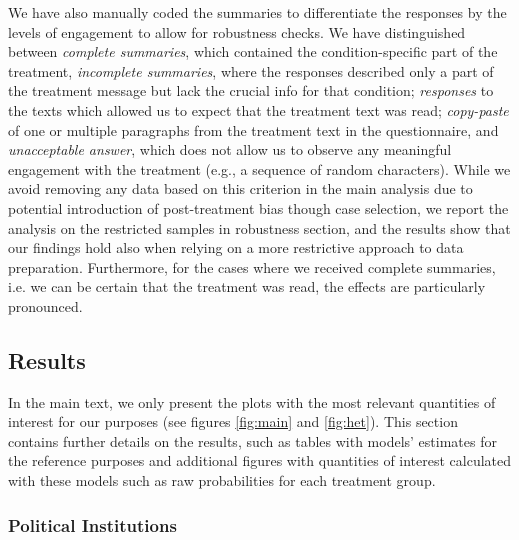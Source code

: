 \documentclass[11pt, ngerman,english,a4]{article}
\begin{document}





\clearpage

We have also manually coded the summaries to differentiate the responses by the levels of engagement to allow for robustness checks. We have distinguished between \textit{complete summaries}, which contained the condition-specific part of the treatment, \textit{incomplete summaries}, where the responses described only a part of the treatment message but lack the crucial info for that condition;  \textit{responses} to the texts which allowed us to expect that the treatment text was read; \textit{copy-paste} of one or multiple paragraphs from the treatment text in the questionnaire, and \textit{unacceptable answer}, which does not allow us to observe any meaningful engagement with the treatment (e.g., a sequence of random characters). While we avoid removing any data based on this criterion in the main analysis due to potential introduction of post-treatment bias though case selection, we report the analysis on the restricted samples in robustness section, and the results show that our findings hold also when relying on a more restrictive approach to data preparation. Furthermore, for the cases where we received complete summaries, i.e. we can be certain that the treatment was read, the effects are particularly pronounced. 




\newpage
\subsection{Results}


In the main text, we only present the plots with the most relevant quantities of interest for our purposes (see figures \ref{fig:main} and \ref{fig:het}). This section contains further details on the results, such as tables with models' estimates for the reference purposes and additional figures with quantities of interest calculated with these models such as raw probabilities for each treatment group. 

\subsubsection*{Political Institutions}
\end{document}
